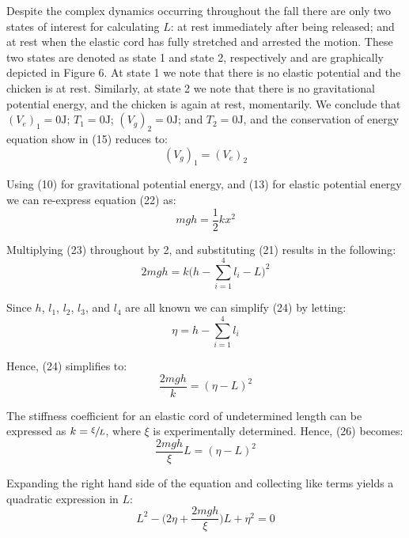 \documentclass[a4paper]{article}
\begin{document}
Despite the complex dynamics occurring throughout the fall there are only two states of interest for calculating $L$: at rest immediately after being released; and at rest when the elastic cord has fully stretched and arrested the motion. These two states are denoted as state 1 and state 2, respectively and are graphically depicted in Figure 6. At state 1 we note that there is no elastic potential and the chicken is at rest. Similarly, at state 2 we note that there is no gravitational potential energy, and the chicken is again at rest, momentarily. We conclude that $(V_e)_1 = 0 \si{\joule}$; $T_1 = 0 \si{\joule}$; $(V_g)_2 = 0\si{\joule}$; and $T_2 = 0 \si{\joule}$, and the conservation of energy equation show in (15) reduces to:
\begin{equation}
(V_g)_1 = (V_e)_2
\end{equation}

Using (10) for gravitational potential energy, and (13) for elastic potential energy we can re-express equation (22) as:
\begin{equation}
mgh = \frac{1}{2}kx^2
\end{equation}

Multiplying (23) throughout by 2, and substituting (21) results in the following:
\begin{equation}
2mgh = k\bigg(h - \sum_{i=1}^{4} l_i - L \bigg)^2
\end{equation}

Since $h$, $l_1$, $l_2$, $l_3$, and $l_4$ are all known we can simplify (24) by letting:
\begin{equation}
\eta = h - \sum_{i=1}^{4} l_i
\end{equation}

Hence, (24) simplifies to:
\begin{equation}
\frac{2mgh}{k} = (\eta - L)^2
\end{equation}

The stiffness coefficient for an elastic cord of undetermined length can be expressed as $k = \sfrac{\xi}{L}$, where $\xi$ is experimentally determined. Hence, (26) becomes:
\begin{equation}
\frac{2mgh}{\xi} L = (\eta - L)^2
\end{equation}

Expanding the right hand side of the equation and collecting like terms yields a quadratic expression in $L$:
\begin{equation}
L^2 - \bigg(2\eta + \frac{2mgh}{\xi}\bigg)L + \eta^2 = 0
\end{equation}
\end{document}
